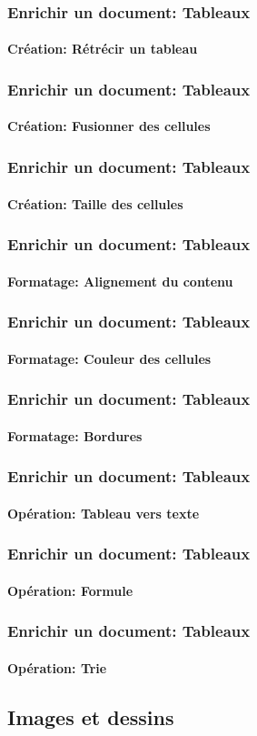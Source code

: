 \documentclass[xcolor=table]{beamer}
\begin{document}
\begin{frame}
\frametitle{Enrichir un document: Tableaux}
\framesubtitle{Création: Rétrécir un tableau}

\end{frame}

\begin{frame}
\frametitle{Enrichir un document: Tableaux}
\framesubtitle{Création: Fusionner des cellules}

\end{frame}

\begin{frame}
\frametitle{Enrichir un document: Tableaux}
\framesubtitle{Création: Taille des cellules}

\end{frame}

\begin{frame}
\frametitle{Enrichir un document: Tableaux}
\framesubtitle{Formatage: Alignement du contenu}

\end{frame}

\begin{frame}
\frametitle{Enrichir un document: Tableaux}
\framesubtitle{Formatage: Couleur des cellules}

\end{frame}

\begin{frame}
\frametitle{Enrichir un document: Tableaux}
\framesubtitle{Formatage: Bordures}

\end{frame}

\begin{frame}
\frametitle{Enrichir un document: Tableaux}
\framesubtitle{Opération: Tableau vers texte}

\end{frame}

\begin{frame}
\frametitle{Enrichir un document: Tableaux}
\framesubtitle{Opération: Formule}

\end{frame}

\begin{frame}
\frametitle{Enrichir un document: Tableaux}
\framesubtitle{Opération: Trie}

\end{frame}


\subsection{Images et dessins}
\end{document}
